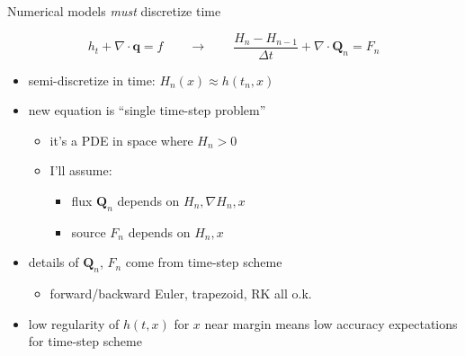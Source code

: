 \documentclass{beamer}
\newcommand\bq{\mathbf{q}}
\newcommand\bQ{\mathbf{Q}}
\newcommand{\Div}{\nabla\cdot}
\newcommand{\grad}{\nabla}
\begin{document}
\begin{frame}{Numerical models \emph{must} discretize time}

$$h_t + \Div\bq = f \qquad \to \qquad \frac{H_n - H_{n-1}}{\Delta t} + \Div \bQ_n = F_n$$

  \begin{itemize}
  \item semi-discretize in time: $H_n(x) \approx h(t_n,x)$
  \item<2-> new equation is ``single time-step problem''
    \begin{itemize}
    \item<2->[$\circ$] it's a PDE in space \alert{where $H_n>0$}
    \item<2->[$\circ$] I'll assume:
       \begin{itemize}
       \item<2->[$\diamond$] flux $\bQ_n$ depends on $H_n,\grad H_n,x$
       \item<2->[$\diamond$] source $F_n$ depends on $H_n,x$
       \end{itemize}
    \end{itemize}
  \item<3-> details of $\bQ_n$, $F_n$ come from time-step scheme
    \begin{itemize}
    \item<3->[$\circ$] forward/backward Euler, trapezoid, RK all o.k.
    \end{itemize}
  \item<4> low regularity of $h(t,x)$ for $x$ near margin means low accuracy expectations for time-step scheme
  \end{itemize}
\end{frame}
\end{document}
